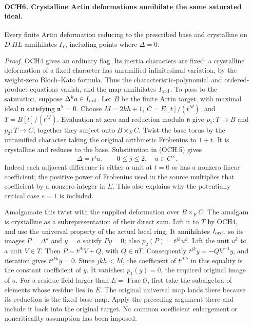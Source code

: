 \documentclass[11pt,a4paper]{article}
\numberwithin{equation}{section}
\theoremstyle{remark}\newtheorem{remark}[theorem]{Remark}
\begin{document}
\paragraph{OCH6. Crystalline Artin deformations annihilate the same saturated ideal.}
\label{claim:OCH6}
Every finite Artin deformation reducing to the prescribed base and
crystalline on \(D.HL\) annihilates \(I_Y\), including points
where \(\Delta=0\).

\emph{Proof.}
OCH4 gives an ordinary flag.  Its inertia characters are fixed:
a crystalline deformation of a fixed character has unramified
infinitesimal variation, by the weight-zero Bloch--Kato formula.
Thus the characteristic-polynomial and ordered-product equations
vanish, and the map annihilates \(I_{\rm ord}\).
To pass to the saturation, suppose \(\Delta^k a\in I_{\rm ord}\).
Let \(B\) be the finite Artin target, with maximal ideal
\(\mathfrak n\) satisfying \(\mathfrak n^h=0\).
Choose \(M=2kh+1\),
\(C=E[t]/(t^M)\), and \(T=B[t]/(t^M)\).
Evaluation at zero and reduction modulo \(\mathfrak n\) give
\(p_1:T\to B\) and \(p_2:T\to C\); together they surject onto
\(B\times_E C\).
Twist the base torus by the unramified character taking the original
arithmetic Frobenius to \(1+t\).  It is crystalline and reduces
to the base.  Substitution in (OCH.5) gives
\[
                   \Delta=t^j u,\qquad 0\le j\le2,
                       \quad u\in C^\times.
 \tag{OCH.6}
\]
Indeed each adjacent difference is either a unit at \(t=0\)
or has a nonzero linear coefficient; the positive power of
Frobenius used in the source multiplies that coefficient by a
nonzero integer in \(E\).  This also explains why the potentially
critical case \(e=1\) is included.

Amalgamate this twist with the supplied deformation over
\(B\times_E C\).  The amalgam is crystalline as a
subrepresentation of their direct sum.  Lift it to \(T\) by
OCH4, and use the universal property of the actual local ring.
It annihilates \(I_{\rm ord}\), so its images \(P=\Delta^k\)
and \(y=a\) satisfy \(Py=0\); also
\(p_2(P)=t^{jk}u^k\).  Lift the unit \(u^k\) to a unit
\(V\in T\).  Then \(P=t^{jk}V+Q\), with
\(Q\in\mathfrak nT\).  Consequently
\(t^{jk}y=-QV^{-1}y\), and iteration gives
\(t^{jkh}y=0\).  Since \(jkh<M\), the coefficient of
\(t^{jkh}\) in this equality is the constant coefficient of
\(y\).  It vanishes: \(p_1(y)=0\), the required original
image of \(a\).
For a residue field larger than \(E=\operatorname{Frac}\mathcal O\),
first take the subalgebra of elements whose residue lies in \(E\).
The original universal map lands there because its reduction is the
fixed base map.  Apply the preceding argument there and include it
back into the original target.  No common coefficient enlargement
or noncriticality assumption has been imposed.
\end{document}
